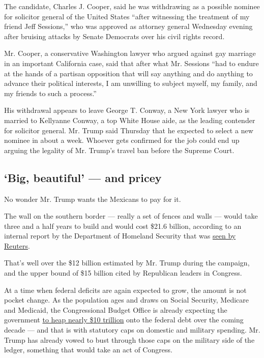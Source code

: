 The candidate, Charles J. Cooper, said he was withdrawing as a possible
nominee for solicitor general of the United States ``after witnessing
the treatment of my friend Jeff Sessions,'' who was approved as attorney
general Wednesday evening after bruising attacks by Senate Democrats
over his civil rights record.

Mr. Cooper, a conservative Washington lawyer who argued against gay
marriage in an important California case, said that after what Mr.
Sessions ``had to endure at the hands of a partisan opposition that will
say anything and do anything to advance their political interests, I am
unwilling to subject myself, my family, and my friends to such a
process.''

His withdrawal appears to leave George T. Conway, a New York lawyer who
is married to Kellyanne Conway, a top White House aide, as the leading
contender for solicitor general. Mr. Trump said Thursday that he
expected to select a new nominee in about a week. Whoever gets confirmed
for the job could end up arguing the legality of Mr. Trump's travel ban
before the Supreme Court.

\hypertarget{big-beautiful--and-pricey}{%
\subsection{`Big, beautiful' --- and
pricey}\label{big-beautiful--and-pricey}}

No wonder Mr. Trump wants the Mexicans to pay for it.

The wall on the southern border --- really a set of fences and walls ---
would take three and a half years to build and would cost \$21.6
billion, according to an internal report by the Department of Homeland
Security that was
\href{http://www.reuters.com/article/us-usa-trump-immigration-wall-exclusive-idUSKBN15O2ZN}{seen
by Reuters}.

That's well over the \$12 billion estimated by Mr. Trump during the
campaign, and the upper bound of \$15 billion cited by Republican
leaders in Congress.

At a time when federal deficits are again expected to grow, the amount
is not pocket change. As the population ages and draws on Social
Security, Medicare and Medicaid, the Congressional Budget Office is
already expecting the government
\href{https://www.nytimes.com/2017/01/24/us/politics/budget-deficit-trump.html?_r=0}{to
heap nearly \$10 trillion} onto the federal debt over the coming decade
--- and that is with statutory caps on domestic and military spending.
Mr. Trump has already vowed to bust through those caps on the military
side of the ledger, something that would take an act of Congress.

